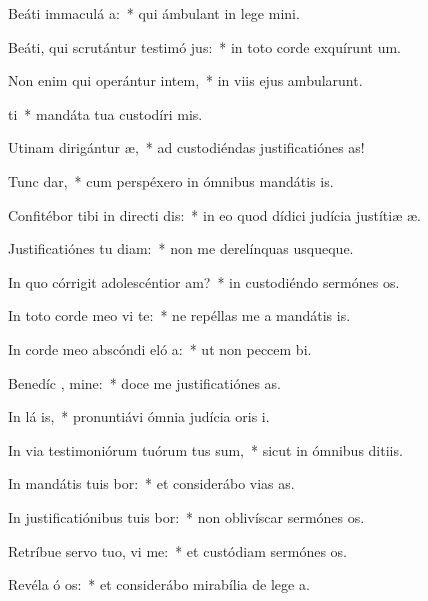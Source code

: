 \item Beáti immaculá  a:~* qui ámbulant in lege mini.
\item Beáti, qui scrutántur testimó jus:~* in toto corde exquírunt um.
\item Non enim qui operántur intem,~* in viis ejus ambularunt.
\item {} ti~* mandáta tua custodíri mis.
\item Utinam dirigántur  æ,~* ad custodiéndas justificatiónes as!
\item Tunc  dar,~* cum perspéxero in ómnibus mandátis is.
\item Confitébor tibi in directi dis:~* in eo quod dídici judícia justítiæ æ.
\item Justificatiónes tu diam:~* non me derelínquas usqueque.
\item In quo córrigit adolescéntior  am?~* in custodiéndo sermónes os.
\item In toto corde meo vi te:~* ne repéllas me a mandátis is.
\item In corde meo abscóndi eló a:~* ut non peccem bi.
\item Benedíc , mine:~* doce me justificatiónes as.
\item In lá is,~* pronuntiávi ómnia judícia oris i.
\item In via testimoniórum tuórum tus sum,~* sicut in ómnibus ditiis.
\item In mandátis tuis bor:~* et considerábo vias as.
\item In justificatiónibus tuis bor:~* non oblivíscar sermónes os.
\item Retríbue servo tuo, vi me:~* et custódiam sermónes os.
\item Revéla ó os:~* et considerábo mirabília de lege a.

